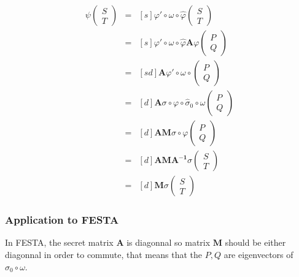 \documentclass[12pt,a4paper]{article}
\begin{document}
		\begin{eqnarray*}
			[s]\psi\begin{pmatrix} S \\ T \end{pmatrix} & = & [s]\varphi'\circ\omega\circ
			\widehat\varphi\begin{pmatrix} S \\ T \end{pmatrix} \\
																									&=& [s]\varphi'\circ\omega\circ\widehat
																									\varphi\mathbf A\varphi
																									\begin{pmatrix} P \\ Q \end{pmatrix} \\
																									& =&[sd]\mathbf A\varphi'\circ\omega\circ
																									\begin{pmatrix} P \\ Q \end{pmatrix}  \\
																									&=&[d]\mathbf A\sigma\circ\varphi\circ\widehat\sigma_0
																									\circ\omega\begin{pmatrix} P \\ Q \end{pmatrix}  \\
																									&=&[d]\mathbf{AM}\sigma\circ\varphi
																									\begin{pmatrix} P \\ Q \end{pmatrix} \\
																									&=&[d]\mathbf{AMA^{-1}}\sigma\begin{pmatrix} S \\ T \end{pmatrix} \\
																									&=&[d]\mathbf{M}\sigma\begin{pmatrix} S \\ T \end{pmatrix} 
		\end{eqnarray*}

		\subsubsection{Application to FESTA}
		In FESTA, the secret matrix $\mathbf A$ is diagonnal so matrix $\mathbf M$ should
		be either diagonnal in order to commute, that means that the  $P,Q$ are eigenvectors
		of $\widehat\sigma_0\circ\omega$.
\end{document}
